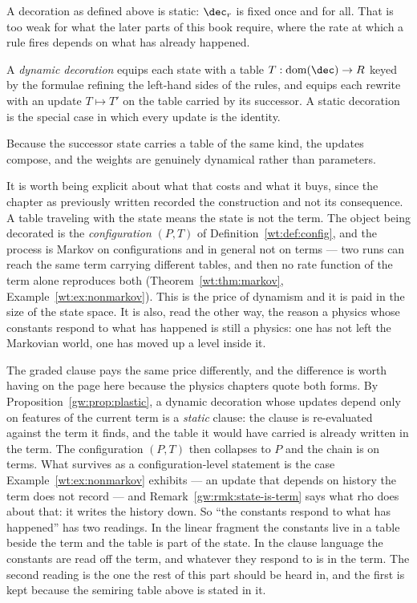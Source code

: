 A decoration as defined above is static: $\dec_r$ is fixed once and for
all.  That is too weak for what the later parts of this book require,
where the rate at which a rule fires depends on what has already happened.

\begin{definition}
\label{def:dyndec}
A \emph{dynamic decoration} equips each state with a table
$T : \mathrm{dom}(\dec) \to R$ keyed by the formulae refining the
left-hand sides of the rules, and equips each rewrite with an update
$T \mapsto T'$ on the table carried by its successor.  A static decoration
is the special case in which every update is the identity.
\end{definition}

Because the successor state carries a table of the same kind, the updates
compose, and the weights are genuinely dynamical rather than parameters.

It is worth being explicit about what that costs and what it buys, since
the chapter as previously written recorded the construction and not its
consequence.  A table traveling with the state means the state is not
the term.  The object being decorated is the \emph{configuration}
$(P, T)$ of Definition~\ref{wt:def:config}, and the process is Markov on
configurations and in general not on terms --- two runs can reach the same
term carrying different tables, and then no rate function of the term
alone reproduces both (Theorem~\ref{wt:thm:markov},
Example~\ref{wt:ex:nonmarkov}).  This is the price of dynamism and it is
paid in the size of the state space.  It is also, read the other way, the
reason a physics whose constants respond to what has happened is still a
physics: one has not left the Markovian world, one has moved up a level
inside it.

The graded clause pays the same price differently, and the difference is
worth having on the page here because the physics chapters quote both
forms.  By Proposition~\ref{gw:prop:plastic}, a dynamic decoration whose
updates depend only on features of the current term is a \emph{static}
clause: the clause is re-evaluated against the term it finds, and the
table it would have carried is already written in the term.  The
configuration $(P,T)$ then collapses to $P$ and the chain is on terms.
What survives as a configuration-level statement is the case
Example~\ref{wt:ex:nonmarkov} exhibits --- an update that depends on
history the term does not record --- and Remark~\ref{gw:rmk:state-is-term}
says what rho does about that: it writes the history down.  So ``the
constants respond to what has happened'' has two readings.  In the linear
fragment the constants live in a table beside the term and the table is
part of the state.  In the clause language the constants are read off the
term, and whatever they respond to is in the term.  The second reading is
the one the rest of this part should be heard in, and the first is kept
because the semiring table above is stated in it.

